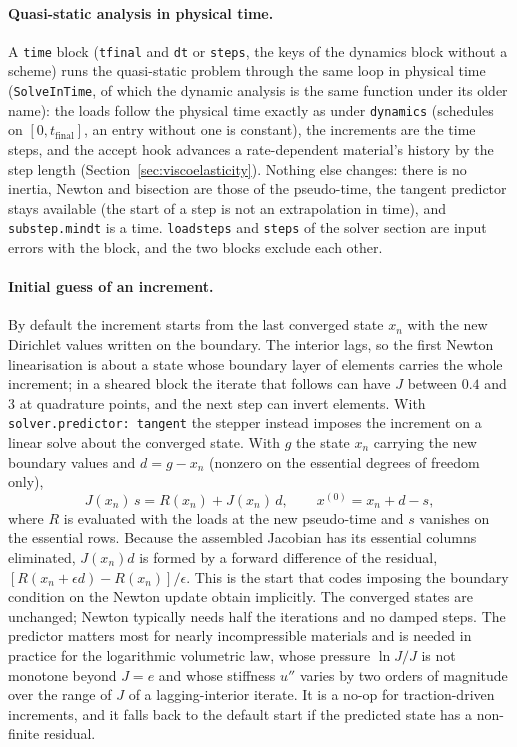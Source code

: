 \documentclass[11pt]{article}
\DeclareRobustCommand{\code}[1]{{\def\_{\textunderscore\allowbreak}\texttt{#1}}}
\begin{document}
\paragraph{Quasi-static analysis in physical time.}
A \code{time} block (\code{t\_final} and \code{dt} or \code{steps}, the
keys of the dynamics block without a scheme) runs the quasi-static problem
through the same loop in physical time (\code{SolveInTime}, of which the
dynamic analysis is the same function under its older name): the loads
follow the physical time exactly as under \code{dynamics} (schedules on
$[0, t_{\text{final}}]$, an entry without one is constant), the increments
are the time steps, and the accept hook advances a rate-dependent
material's history by the step length (Section~\ref{sec:viscoelasticity}).
Nothing else changes: there is no inertia, Newton and bisection are those
of the pseudo-time, the tangent predictor stays available (the start of a
step is not an extrapolation in time), and \code{substep.min\_dt} is a
time.  \code{load\_steps} and \code{steps} of the solver section are input
errors with the block, and the two blocks exclude each other.

\paragraph{Initial guess of an increment.}
By default the increment starts from the last converged state $x_n$ with
the new Dirichlet values written on the boundary.  The interior lags, so
the first Newton linearisation is about a state whose boundary layer of
elements carries the whole increment; in a sheared block the iterate that
follows can have $J$ between $0.4$ and $3$ at quadrature points, and the
next step can invert elements.  With \code{solver.predictor: tangent} the
stepper instead imposes the increment on a linear solve about the converged
state.  With $g$ the state $x_n$ carrying the new boundary values and
$d = g - x_n$ (nonzero on the essential degrees of freedom only),
\begin{equation}
  J(x_n)\,s = R(x_n) + J(x_n)\,d, \qquad x^{(0)} = x_n + d - s ,
\end{equation}
where $R$ is evaluated with the loads at the new pseudo-time and $s$
vanishes on the essential rows.  Because the assembled Jacobian has its
essential columns eliminated, $J(x_n)d$ is formed by a forward difference of
the residual, $[R(x_n + \epsilon d) - R(x_n)]/\epsilon$.  This is the start
that codes imposing the boundary condition on the Newton update obtain
implicitly.  The converged states are unchanged; Newton typically needs
half the iterations and no damped steps.  The predictor matters most for
nearly incompressible materials and is needed in practice for the
logarithmic volumetric law, whose pressure $\ln J/J$ is not monotone beyond
$J = e$ and whose stiffness $u''$ varies by two orders of magnitude over
the range of $J$ of a lagging-interior iterate.  It is a no-op for
traction-driven increments, and it falls back to the default start if the
predicted state has a non-finite residual.
\end{document}
